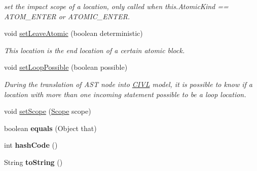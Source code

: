 \begin{DoxyCompactItemize}
\begin{DoxyCompactList}\small\item\em set the impact scope of a location, only called when this.\+Atomic\+Kind == A\+T\+O\+M\+\_\+\+E\+N\+T\+E\+R or A\+T\+O\+M\+I\+C\+\_\+\+E\+N\+T\+E\+R. \end{DoxyCompactList}\item 
void \hyperlink{classedu_1_1udel_1_1cis_1_1vsl_1_1civl_1_1model_1_1common_1_1location_1_1CommonLocation_ad0c26c9af83bc469844a50825f83a1ac}{set\+Leave\+Atomic} (boolean deterministic)
\begin{DoxyCompactList}\small\item\em This location is the end location of a certain atomic block. \end{DoxyCompactList}\item 
void \hyperlink{classedu_1_1udel_1_1cis_1_1vsl_1_1civl_1_1model_1_1common_1_1location_1_1CommonLocation_a47ccce53e01b13aa4c3a74804988a698}{set\+Loop\+Possible} (boolean possible)
\begin{DoxyCompactList}\small\item\em During the translation of A\+S\+T node into \hyperlink{classedu_1_1udel_1_1cis_1_1vsl_1_1civl_1_1CIVL}{C\+I\+V\+L} model, it is possible to know if a location with more than one incoming statement possible to be a loop location. \end{DoxyCompactList}\item 
void \hyperlink{classedu_1_1udel_1_1cis_1_1vsl_1_1civl_1_1model_1_1common_1_1location_1_1CommonLocation_a4bf81fc8bef99f0081b1a061836c665f}{set\+Scope} (\hyperlink{interfaceedu_1_1udel_1_1cis_1_1vsl_1_1civl_1_1model_1_1IF_1_1Scope}{Scope} scope)
\item 
\hypertarget{classedu_1_1udel_1_1cis_1_1vsl_1_1civl_1_1model_1_1common_1_1location_1_1CommonLocation_af4b41a27245d0737caaa7be3d83de1af}{}boolean {\bfseries equals} (Object that)\label{classedu_1_1udel_1_1cis_1_1vsl_1_1civl_1_1model_1_1common_1_1location_1_1CommonLocation_af4b41a27245d0737caaa7be3d83de1af}

\item 
\hypertarget{classedu_1_1udel_1_1cis_1_1vsl_1_1civl_1_1model_1_1common_1_1location_1_1CommonLocation_a51de4d40b54864509b30b0e18b059d7a}{}int {\bfseries hash\+Code} ()\label{classedu_1_1udel_1_1cis_1_1vsl_1_1civl_1_1model_1_1common_1_1location_1_1CommonLocation_a51de4d40b54864509b30b0e18b059d7a}

\item 
\hypertarget{classedu_1_1udel_1_1cis_1_1vsl_1_1civl_1_1model_1_1common_1_1location_1_1CommonLocation_a61e9b9443b4db8f8a39589bedf4ce3f2}{}String {\bfseries to\+String} ()\label{classedu_1_1udel_1_1cis_1_1vsl_1_1civl_1_1model_1_1common_1_1location_1_1CommonLocation_a61e9b9443b4db8f8a39589bedf4ce3f2}


\end{DoxyCompactItemize}
